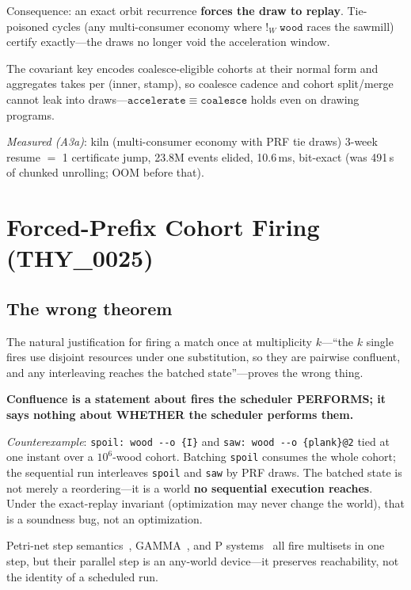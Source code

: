 \documentclass[11pt]{article}
\theoremstyle{remark}
\begin{document}
Consequence: an exact orbit recurrence \textbf{forces the draw to replay}.
Tie-poisoned cycles (any multi-consumer economy where $!_W\;\mathtt{wood}$ races
the sawmill) certify exactly---the draws no longer void the acceleration window.

The covariant key encodes coalesce-eligible cohorts at their normal form and
aggregates takes per (inner, stamp), so coalesce cadence and cohort split/merge
cannot leak into draws---$\mathtt{accelerate} \equiv \mathtt{coalesce}$ holds
even on drawing programs.

\textit{Measured (A3a)}: kiln (multi-consumer economy with PRF tie draws) 3-week
resume $=$ 1 certificate jump, 23.8M events elided, 10.6\,ms, bit-exact (was
491\,s of chunked unrolling; OOM before that).

\section{Forced-Prefix Cohort Firing (THY\_0025)}
\label{sec:cohort-firing}

\subsection{The wrong theorem}
\label{sec:wrong-theorem}

The natural justification for firing a match once at multiplicity $k$---``the
$k$ single fires use disjoint resources under one substitution, so they are
pairwise confluent, and any interleaving reaches the batched state''---proves the
wrong thing.

\textbf{Confluence is a statement about fires the scheduler PERFORMS; it says
nothing about WHETHER the scheduler performs them.}

\textit{Counterexample}: \texttt{spoil: wood -{}-o \{I\}} and
\texttt{saw: wood -{}-o \{plank\}@2} tied at one instant over a $10^6$-wood
cohort.  Batching \texttt{spoil} consumes the whole cohort; the sequential run
interleaves \texttt{spoil} and \texttt{saw} by PRF draws.  The batched state is
not merely a reordering---it is a world \textbf{no sequential execution reaches}.
Under the exact-replay invariant (optimization may never change the world), that
is a soundness bug, not an optimization.

Petri-net step semantics~\cite{BestDevillers87}, GAMMA~\cite{BanatreLeMet90},
and P systems~\cite{Paun00} all fire multisets in one step, but their parallel
step is an any-world device---it preserves reachability, not the identity of a
scheduled run.
\end{document}
